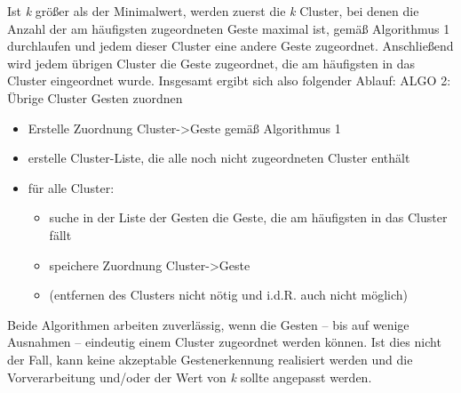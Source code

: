 Ist \emph{k} größer als der Minimalwert, werden zuerst die \emph{k} Cluster, bei denen die Anzahl der am häufigsten zugeordneten Geste maximal ist, gemäß 
Algorithmus 1
durchlaufen und jedem dieser Cluster eine andere Geste zugeordnet. Anschließend wird jedem übrigen Cluster die Geste zugeordnet, die am häufigsten in das Cluster eingeordnet wurde.
Insgesamt ergibt sich also folgender Ablauf:
    ALGO 2: Übrige Cluster Gesten zuordnen
    \begin{itemize}
	\item Erstelle Zuordnung Cluster->Geste gemäß Algorithmus 1
    \item erstelle Cluster-Liste, die alle noch nicht zugeordneten Cluster enthält
    \item für alle Cluster:
    \begin{itemize}

        \item suche in der Liste der Gesten die Geste, die am häufigsten in das Cluster fällt
        \item speichere Zuordnung Cluster->Geste
        \item (entfernen des Clusters nicht nötig und i.d.R. auch nicht möglich)
        \end{itemize}
   \end{itemize}

Beide Algorithmen arbeiten
zuverlässig, wenn die Gesten -- bis auf wenige Ausnahmen -- eindeutig einem Cluster zugeordnet werden können. Ist dies nicht der Fall, kann keine akzeptable Gestenerkennung realisiert werden und die Vorverarbeitung und/oder der Wert von \emph{k} sollte angepasst werden.



